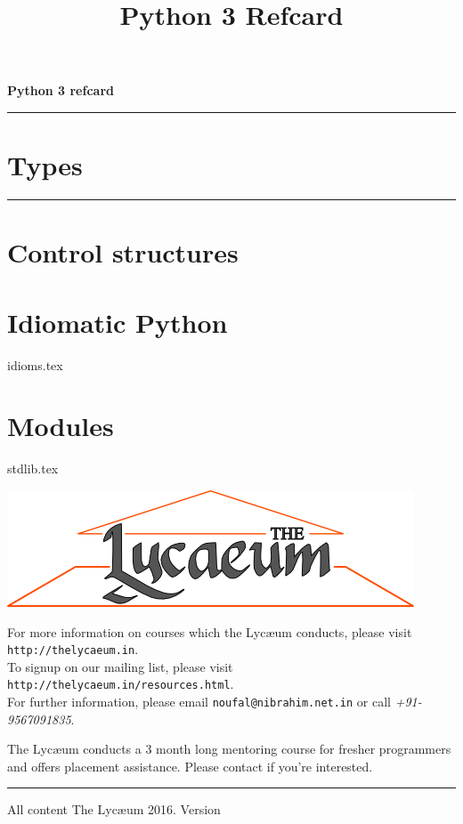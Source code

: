 \documentclass{refsheet}
\title{Python 3 Refcard}
\date{}
\author{}
\begin{document}
\begin{center}
\Large \textbf{Python 3 refcard}
\noindent\rule{\linewidth}{0.5ex}
\end{center}
\normalsize

\section{Types}







\noindent\rule{\linewidth}{0.05ex}
\section{Control structures}







\section{Idiomatic Python}
 {idioms.tex}

\section{Modules}
 {stdlib.tex}

\begin{center}
\includegraphics[scale=0.4]{images/parthenon-callig.png}
\end{center}
For more information on courses which the Lyc\ae{}um conducts, please
visit \texttt{http://thelycaeum.in}. \\To signup on our mailing list,
please visit \texttt{http://thelycaeum.in/resources.html}. \\For further
information, please email \texttt{noufal@nibrahim.net.in} or call
\textit{+91-9567091835}.
\vspace{0.5cm}

The Lyc\ae{}um conducts a 3 month long mentoring course for fresher
programmers and offers placement assistance. Please contact if you're
interested.

\noindent\rule{\linewidth}{0.05ex}
\footnotesize All content \textcopyright The Lyc\ae{}um 2016. Version 
\end{document}
